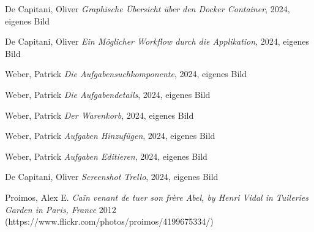\documentclass[12pt,a4paper]{scrartcl} %
\begin{document}
\renewcommand{\refname}{Quellenverzeichnis}

\begin{thebibliography}{11} 

 De Capitani, Oliver {\em Graphische Übersicht über den Docker Container}, 2024, eigenes Bild

 De Capitani, Oliver {\em Ein Möglicher Workflow durch die Applikation}, 2024, eigenes Bild

 Weber, Patrick {\em Die Aufgabensuchkomponente}, 2024, eigenes Bild

 Weber, Patrick {\em Die Aufgabendetails}, 2024, eigenes Bild

 Weber, Patrick {\em Der Warenkorb}, 2024, eigenes Bild

 Weber, Patrick {\em Aufgaben Hinzufügen}, 2024, eigenes Bild

 Weber, Patrick {\em Aufgaben Editieren}, 2024, eigenes Bild

 De Capitani, Oliver {\em Screenshot Trello}, 2024, eigenes Bild

 Proimos, Alex E. {\em Caïn venant de tuer son frère Abel, by Henri Vidal in Tuileries Garden in Paris, France} 2012 (https://www.flickr.com/photos/proimos/4199675334/)



\end{thebibliography}
\end{document}
